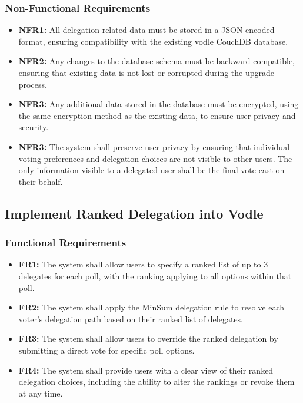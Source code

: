 \subsubsection{Non-Functional Requirements}
\begin{itemize}
    \item \textbf{NFR1:} All delegation-related data must be stored in a JSON-encoded format, ensuring compatibility with the existing vodle CouchDB database.
    \item \textbf{NFR2:} Any changes to the database schema must be backward compatible, ensuring that existing data is not lost or corrupted during the upgrade process.
    \item \textbf{NFR3:} Any additional data stored in the database must be encrypted, using the same encryption method as the existing data, to ensure user privacy and security.
    \item \textbf{NFR3:} The system shall preserve user privacy by ensuring that individual voting preferences and delegation choices are not visible to other users. The only information visible to a delegated user shall be the final vote cast on their behalf.
\end{itemize}

\subsection{Implement Ranked Delegation into Vodle}

\subsubsection{Functional Requirements}
\begin{itemize}
    \item \textbf{FR1:} The system shall allow users to specify a ranked list of up to 3 delegates for each poll, with the ranking applying to all options within that poll.
    
    \item \textbf{FR2:} The system shall apply the MinSum delegation rule to resolve each voter's delegation path based on their ranked list of delegates.
    
    \item \textbf{FR3:} The system shall allow users to override the ranked delegation by submitting a direct vote for specific poll options.
    
    \item \textbf{FR4:} The system shall provide users with a clear view of their ranked delegation choices, including the ability to alter the rankings or revoke them at any time.
\end{itemize}

